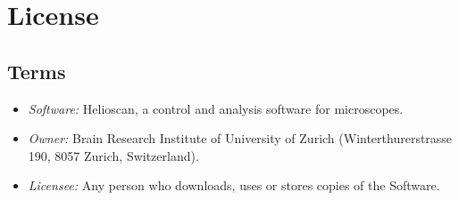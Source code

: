 \chapter{\HS License}

\section{Terms}
\begin{itemize}
	\item \textit{Software:} Helioscan, a control and analysis software for microscopes.
	\item \textit{Owner:} Brain Research Institute of University of Zurich (Winterthurerstrasse 190, 8057 Zurich, Switzerland).
	\item \textit{Licensee:} Any person who downloads, uses or stores copies of the Software.
\end{itemize}


